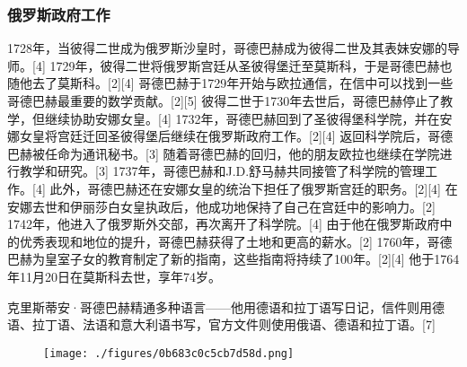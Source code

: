 \subsubsection{俄罗斯政府工作} 
1728年，当彼得二世成为俄罗斯沙皇时，哥德巴赫成为彼得二世及其表妹安娜的导师。[4] 1729年，彼得二世将俄罗斯宫廷从圣彼得堡迁至莫斯科，于是哥德巴赫也随他去了莫斯科。[2][4] 哥德巴赫于1729年开始与欧拉通信，在信中可以找到一些哥德巴赫最重要的数学贡献。[2][5] 彼得二世于1730年去世后，哥德巴赫停止了教学，但继续协助安娜女皇。[4] 1732年，哥德巴赫回到了圣彼得堡科学院，并在安娜女皇将宫廷迁回圣彼得堡后继续在俄罗斯政府工作。[2][4] 返回科学院后，哥德巴赫被任命为通讯秘书。[3] 随着哥德巴赫的回归，他的朋友欧拉也继续在学院进行教学和研究。[3] 1737年，哥德巴赫和J.D.舒马赫共同接管了科学院的管理工作。[4] 此外，哥德巴赫还在安娜女皇的统治下担任了俄罗斯宫廷的职务。[2][4] 在安娜去世和伊丽莎白女皇执政后，他成功地保持了自己在宫廷中的影响力。[2] 1742年，他进入了俄罗斯外交部，再次离开了科学院。[4] 由于他在俄罗斯政府中的优秀表现和地位的提升，哥德巴赫获得了土地和更高的薪水。[2] 1760年，哥德巴赫为皇室子女的教育制定了新的指南，这些指南将持续了100年。[2][4] 他于1764年11月20日在莫斯科去世，享年74岁。

克里斯蒂安·哥德巴赫精通多种语言——他用德语和拉丁语写日记，信件则用德语、拉丁语、法语和意大利语书写，官方文件则使用俄语、德语和拉丁语。[7]

\begin{figure}[ht]
\centering
\texttt{[image: ./figures/0b683c0c5cb7d58d.png]}
\caption{} \label{fig_Goldba_2}
\end{figure}